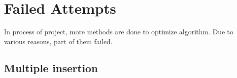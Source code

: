 \documentclass[journal]{IEEEtran}
\begin{document}
	
	
	
	
	
	\section{Failed Attempts}
	
	In process of project, more methods are done to optimize algorithm. Due to various reasons, part of them failed.
	
	\subsection{Multiple insertion}
	
\end{document}
